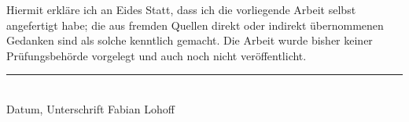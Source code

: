 Hiermit erkläre ich an Eides Statt, dass ich die vorliegende Arbeit selbst
angefertigt habe; die aus fremden Quellen direkt oder indirekt übernommenen
Gedanken sind als solche kenntlich gemacht.
Die Arbeit wurde bisher keiner Prüfungsbehörde vorgelegt und auch noch nicht
veröffentlicht.

\noindent
\begin{minipage}[t]{0.45\textwidth}
    \centering
    \rule{\textwidth}{0.4pt}\\
    Datum, Unterschrift Fabian Lohoff
\end{minipage}
\hfill